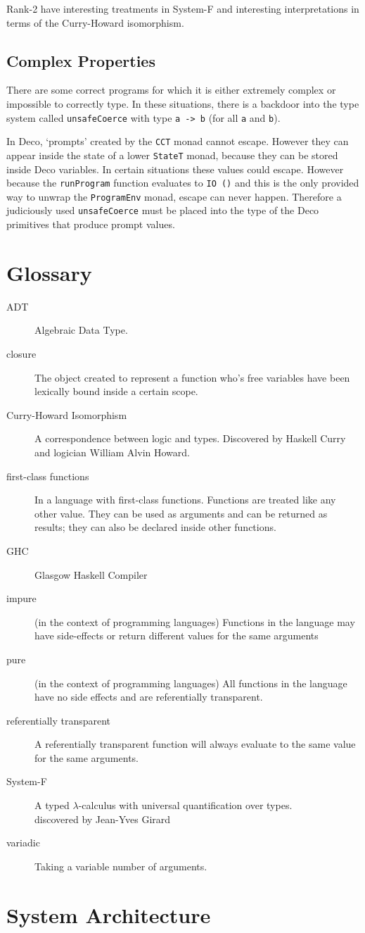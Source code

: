 \documentclass[]{article}
\newcommand{\function}[1]{\texttt{#1}}
\newcommand{\type}[1]{\texttt{#1}}
\begin{document}
Rank-2 have interesting treatments in System-F and interesting interpretations
in terms of the Curry-Howard isomorphism.

\subsection{Complex Properties}
\label{discussion:unsafecast}

There are some correct programs for which it is either extremely
complex or impossible to correctly type. In these situations,
there is a backdoor into the type system called \function{unsafeCoerce}
with type \type{a -> b} (for all \type{a} and \type{b}).

In Deco, `prompts' created by the \type{CCT} monad cannot escape. However they
can appear inside the state of a lower \type{StateT} monad, because they can
be stored inside Deco variables. In certain situations these values could
escape. However because the \function{runProgram} function evaluates to
\type{IO ()} and this is the only provided way to unwrap the \type{ProgramEnv}
monad, escape can never happen. Therefore a judiciously used
\function{unsafeCoerce} must be placed into the type of the Deco primitives
that produce prompt values.

\section{Glossary}
\begin{description}
\item[ADT] Algebraic Data Type.
\item[closure]
  The object created to represent a function who's free variables have been
  lexically bound inside a certain scope.
\item[Curry-Howard Isomorphism]
  A correspondence between logic and types.
  Discovered by Haskell Curry and logician William Alvin Howard.
\item[first-class functions] In a language with first-class functions.
  Functions are treated like any other value. They can be used as arguments
  and can be returned as results; they can also be declared inside other
  functions.
\item[GHC] Glasgow Haskell Compiler
\item[impure] (in the context of programming languages)
  Functions in the language may have side-effects or
  return different values for the same arguments
\item[pure] (in the context of programming languages)
  All functions in the language have no side effects
  and are referentially transparent.
\item[referentially transparent] A referentially transparent function will always
  evaluate to the same value for the same arguments.
\item[System-F]
  A typed $\lambda$-calculus with universal quantification over types.\\
  discovered by Jean-Yves Girard
\item[variadic] Taking a variable number of arguments.
\end{description}

\section{System Architecture}




\end{document}
